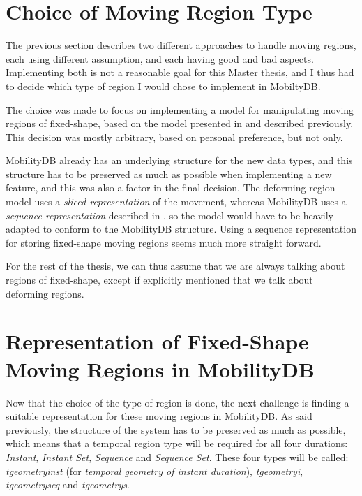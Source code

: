 
\section{Choice of Moving Region Type}
\label{section:region_type_choice}

The previous section describes two different approaches to handle moving regions, each using different assumption, and each having good and bad aspects. Implementing both is not a reasonable goal for this Master thesis, and I thus had to decide which type of region I would chose to implement in MobiltyDB.

The choice was made to focus on implementing a model for manipulating moving regions of fixed-shape, based on the model presented in \cite{fmregion} and described previously. This decision was mostly arbitrary, based on personal preference, but not only. 

MobilityDB already has an underlying structure for the new data types, and this structure has to be preserved as much as possible when implementing a new feature, and this was also a factor in the final decision. The deforming region model uses a \textit{sliced representation} of the movement, whereas MobilityDB uses a \textit{sequence representation} described in \cite{mobilitydb}, so the model would have to be heavily adapted to conform to the MobilityDB structure. Using a sequence representation for storing fixed-shape moving regions seems much more straight forward.

For the rest of the thesis, we can thus assume that we are always talking about regions of fixed-shape, except if explicitly mentioned that we talk about deforming regions.

\section{Representation of Fixed-Shape Moving Regions in MobilityDB}
\label{section:internal_repr}

Now that the choice of the type of region is done, the next challenge is finding a suitable representation for these moving regions in MobilityDB. As said previously, the structure of the system has to be preserved as much as possible, which means that a temporal region type will be required for all four durations: \textit{Instant}, \textit{Instant Set}, \textit{Sequence} and \textit{Sequence Set}. These four types will be called: \textit{tgeometryinst} (for \textit{temporal geometry of instant duration}), \textit{tgeometryi}, \textit{tgeometryseq} and \textit{tgeometrys}.

